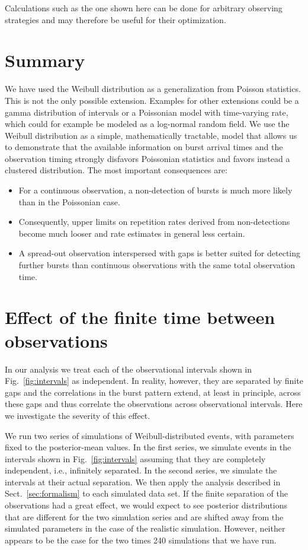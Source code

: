 \documentclass[fleqn,usenatbib]{mnras}
\newcommand{\new}[1]{#1}
\begin{document}
Calculations such as the one shown here can be done for arbitrary observing strategies and may therefore be useful for their optimization.


\section{Summary}
\label{sec:summary}


\new{We have used the Weibull distribution as a generalization from Poisson statistics. This is not the only possible extension. Examples for other extensions could be a gamma distribution of intervals or a Poissonian model with time-varying rate, which could for example be modeled as a log-normal random field. We use the Weibull distribution as a simple, mathematically tractable, model that allows us to demonstrate that the available information on burst arrival times and the observation timing strongly disfavors Poissonian statistics and favors instead a clustered distribution. The most important consequences are:
\begin{itemize}
	\item For a continuous observation, a non-detection of bursts is much more likely than in the Poissonian case.
	\item Consequently, upper limits on repetition rates derived from non-detections become much looser and rate estimates in general less certain.
	\item A spread-out observation interspersed with gaps is better suited for detecting further bursts than continuous observations with the same total observation time.
\end{itemize}}



\appendix
\section{Effect of the finite time between observations}
\label{sec:finiteness}

In our analysis we treat each of the observational intervals shown in Fig.~\ref{fig:intervals} as independent. In reality, however, they are separated by finite gaps and the correlations in the burst pattern extend, at least in principle, across these gaps and thus correlate the observations across observational intervals. Here we investigate the severity of this effect.

We run two series of simulations of Weibull-distributed events, with parameters fixed to the posterior-mean values. In the first series, we simulate events in the intervals shown in Fig.~\ref{fig:intervals} assuming that they are completely independent, i.e., infinitely separated. In the second series, we simulate the intervals at their actual separation. We then apply the analysis described in Sect.~\ref{sec:formalism} to each simulated data set. If the finite separation of the observations had a great effect, we would expect to see posterior distributions that are different for the two simulation series and are shifted away from the simulated parameters in the case of the realistic simulation. However, neither appears to be the case for the two times 240 simulations that we have run.
\end{document}
